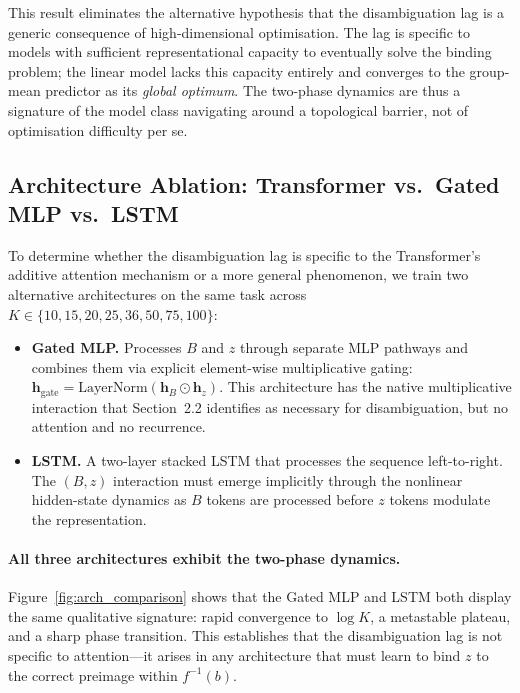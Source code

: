 This result eliminates the alternative hypothesis that the disambiguation lag is a generic consequence of high-dimensional optimisation. The lag is specific to models with sufficient representational capacity to eventually solve the binding problem; the linear model lacks this capacity entirely and converges to the group-mean predictor as its \emph{global optimum}. The two-phase dynamics are thus a signature of the model class navigating around a topological barrier, not of optimisation difficulty per se.

\subsection{Architecture Ablation: Transformer vs.\ Gated MLP vs.\ LSTM}

To determine whether the disambiguation lag is specific to the Transformer's additive attention mechanism or a more general phenomenon, we train two alternative architectures on the same task across $K \in \{10, 15, 20, 25, 36, 50, 75, 100\}$:

\begin{itemize}
    \item \textbf{Gated MLP.} Processes $B$ and $z$ through separate MLP pathways and combines them via explicit element-wise multiplicative gating: $\mathbf{h}_\text{gate} = \text{LayerNorm}(\mathbf{h}_B \odot \mathbf{h}_z)$. This architecture has the native multiplicative interaction that Section~2.2 identifies as necessary for disambiguation, but no attention and no recurrence.
    \item \textbf{LSTM.} A two-layer stacked LSTM that processes the sequence left-to-right. The $(B, z)$ interaction must emerge implicitly through the nonlinear hidden-state dynamics as $B$ tokens are processed before $z$ tokens modulate the representation.
\end{itemize}

\paragraph{All three architectures exhibit the two-phase dynamics.}
Figure~\ref{fig:arch_comparison} shows that the Gated MLP and LSTM both display the same qualitative signature: rapid convergence to $\log K$, a metastable plateau, and a sharp phase transition. This establishes that the disambiguation lag is not specific to attention---it arises in any architecture that must learn to bind $z$ to the correct preimage within $f^{-1}(b)$.

